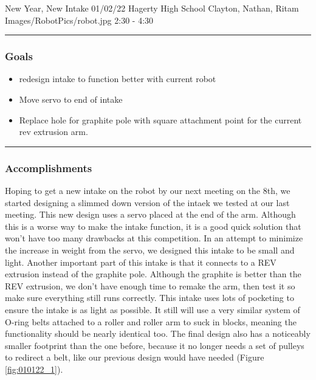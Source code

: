 \insertmeeting 
  {New Year, New Intake} 
  {01/02/22} 
  {Hagerty High School}
  {Clayton, Nathan, Ritam}
  {Images/RobotPics/robot.jpg}
  {2:30 - 4:30}
  
\noindent\hfil\rule{\textwidth}{.4pt}\hfil
\subsubsection*{Goals}
\begin{itemize}
    \item redesign intake to function better with current robot
    \item Move servo to end of intake
    \item Replace hole for graphite pole with square attachment point for the current rev extrusion arm.
\end{itemize} 

\noindent\hfil\rule{\textwidth}{.4pt}\hfil

\subsubsection*{Accomplishments}
Hoping to get a new intake on the robot by our next meeting on the 8th, we started designing a slimmed down version of the intaek we tested at our last meeting. This new design uses a servo placed at the end of the arm. Although this is a worse way to make the intake function, it is a good quick solution that won’t have too many drawbacks at this competition. In an attempt to minimize the increase in weight from the servo, we designed this intake to be small and light. Another important part of this intake is that it connects to a REV extrusion instead of the graphite pole. Although the graphite is better than the REV extrusion, we don’t have enough time to remake the arm, then test it so make sure everything still runs correctly. This intake uses lots of pocketing to ensure the intake is as light as possible. It still will use a very similar system of O-ring belts attached to a roller and roller arm to suck in blocks, meaning the functionality should be nearly identical too. The final design also has a noticeably smaller footprint than the one before, because it no longer needs a set of pulleys to redirect a belt, like our previous design would have needed (Figure \ref{fig:010122_1}).

